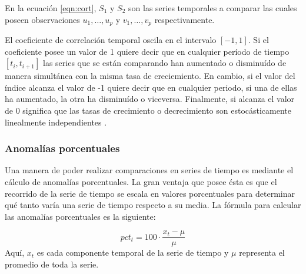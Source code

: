      En la ecuación \ref{eqn:cort}, $S_1$ y $S_2$ son las series temporales a comparar las cuales poseen observaciones $ u_1,\dots,u_p $ y $ v_1,\dots,v_p$ respectivamente.

     El coeficiente de correlación temporal oscila en el intervalo $[-1,1]$. Si el coeficiente posee un valor de 1 quiere decir que en cualquier período de tiempo $[t_i,t_{i+1}]$ las series
     que se están comparando han aumentado o disminuído de manera simultánea con la misma tasa de creciemiento. En cambio, si el valor del índice alcanza el valor de -1 quiere decir que en cualquier periodo, si una de ellas ha
     aumentado, la otra ha disminuído o viceversa. Finalmente, si alcanza el valor de 0 significa que las tasas de crecimiento o decrecimiento son estocásticamente linealmente independientes \cite{27}.

     \subsubsection{Anomalías porcentuales}
     Una manera de poder realizar comparaciones en series de tiempo es mediante el cálculo de anomalías porcentuales. La gran ventaja que posee ésta es que el recorrido de la serie de tiempo
     se escala en valores porcentuales para determinar qué tanto varía una serie de tiempo respecto a su media. La fórmula para calcular las anomalías porcentuales es la siguiente:

    \begin{equation}\label{pct_anomalies}
        pct_t = 100 \cdot\frac{x_t-\mu}{\mu}
    \end{equation}
    Aquí, $x_t$ es cada componente temporal de la serie de tiempo y $\mu$ representa el promedio de toda la serie. 
